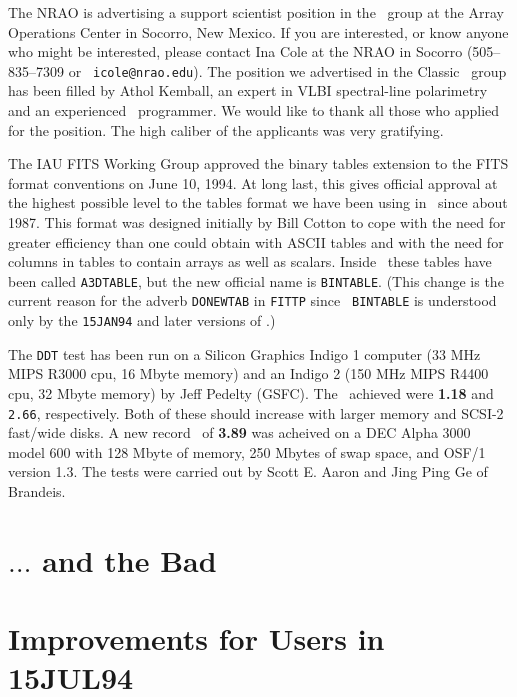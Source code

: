 The NRAO is advertising a support scientist position in the \AIPTOO\
group at the Array Operations Center in Socorro, New Mexico.  If you
are interested, or know anyone who might be interested, please contact
Ina Cole at the NRAO in Socorro (505--835--7309 or {\tt
icole@nrao.edu}).  The position we advertised in the Classic \AIPS\
group has been filled by Athol Kemball, an expert in VLBI
spectral-line polarimetry and an experienced \AIPS\ programmer.  We
would like to thank all those who applied for the position.  The high
caliber of the applicants was very gratifying.

The IAU FITS Working Group approved the binary tables extension to the
FITS format conventions on June 10, 1994.  At long last, this gives
official approval at the highest possible level to the tables format
we have been using in \AIPS\ since about 1987.  This format was
designed initially by Bill Cotton to cope with the need for greater
efficiency than one could obtain with ASCII tables and with the need
for columns in tables to contain arrays as well as scalars.  Inside
\AIPS\ these tables have been called {\tt A3DTABLE}, but the new
official name is \hbox{{\tt BINTABLE}}.  (This change is the current
reason for the adverb {\tt DONEWTAB} in {\tt FITTP} since {\tt
BINTABLE} is understood only by the {\tt 15JAN94} and later versions
of \AIPS.)

The {\tt DDT} test has been run on a Silicon Graphics Indigo 1
computer (33 MHz MIPS R3000 cpu, 16 Mbyte memory) and an Indigo 2
(150 MHz MIPS R4400 cpu, 32 Mbyte memory) by Jeff Pedelty (GSFC).  The
\AMarks\ achieved were {\bf 1.18} and {\tt 2.66}, respectively.  Both
of these should increase with larger memory and SCSI-2 fast/wide
disks.  A new record \AMark\ of {\bf 3.89} was acheived on a DEC Alpha
3000 model 600 with 128 Mbyte of memory, 250 Mbytes of swap space, and
OSF/1 version 1.3.  The tests were carried out by Scott E. Aaron and
Jing Ping Ge of Brandeis.

\section{$\ldots$ and the Bad}

\vfill\eject

\section{Improvements for Users in 15JUL94}


